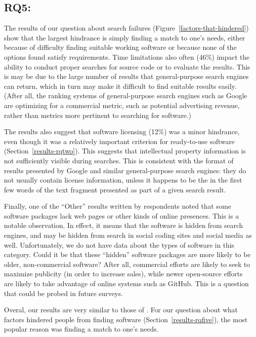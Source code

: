 \documentclass[review]{elsarticle}
\begin{document}
\subsection{RQ5: \rqfivetext}
\label{discussion-rqfive}

The results of our question about search failures (Figure~\ref{factors-that-hindered}) show that the largest hindrance is simply finding a match to one's needs, either because of difficulty finding suitable working software or because none of the options found satisfy requirements.  Time limitations also often (46\%) impact the ability to conduct proper searches for source code or to evaluate the results.  This is may be due to the large number of results that general-purpose search engines can return, which in turn may make it difficult to find suitable results easily.  (After all, the ranking systems of general-purpose search engines such as Google are optimizing for a commercial metric, such as potential advertising revenue, rather than metrics more pertinent to searching for software.)

The results also suggest that software licensing (12\%) was a minor hindrance, even though it was a relatively important criterion for ready-to-use software (Section~\ref{results-rqtwo}).  This suggests that intellectual property information is not sufficiently visible during searches.  This is consistent with the format of results presented by Google and similar general-purpose search engines: they do not usually contain license information, unless it happens to be the in the first few words of the text fragment presented as part of a given search result.

Finally, one of the ``Other'' results written by respondents noted that some software packages lack web pages or other kinds of online presences.  This is a notable observation.  In effect, it means that the software is hidden from search engines, and may be hidden from search in social coding sites and social media as well.  Unfortunately, we do not have data about the types of software in this category.  Could it be that these ``hidden'' software packages are more likely to be older, non-commercial software? After all, commercial efforts are likely to seek to maximize publicity (in order to increase sales), while newer open-source efforts are likely to take advantage of online systems such as GitHub.  This is a question that could be probed in future surveys.

Overal, our results are very similar to those of \citet{samadi_2004}.  For our question about what factors hindered people from finding software (Section~\ref{results-rqfive}), the most popular reason was finding a match to one's needs.
\end{document}
